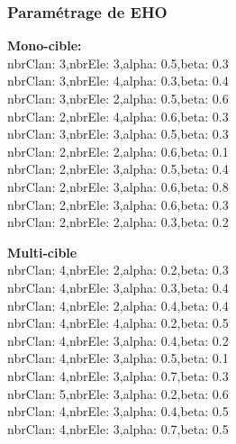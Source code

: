 \subsubsection{Paramétrage de EHO}
\noindent
\begin{minipage}[t]{0.55\textwidth}
	\textbf{Mono-cible:} \\
nbrClan: 3,nbrEle: 3,alpha: 0.5,beta: 0.3\\
nbrClan: 3,nbrEle: 4,alpha: 0.3,beta: 0.4\\
nbrClan: 3,nbrEle: 2,alpha: 0.5,beta: 0.6\\
nbrClan: 2,nbrEle: 4,alpha: 0.6,beta: 0.3\\
nbrClan: 3,nbrEle: 3,alpha: 0.5,beta: 0.3\\
nbrClan: 2,nbrEle: 2,alpha: 0.6,beta: 0.1\\
nbrClan: 2,nbrEle: 3,alpha: 0.5,beta: 0.4\\
nbrClan: 2,nbrEle: 3,alpha: 0.6,beta: 0.8\\
nbrClan: 2,nbrEle: 3,alpha: 0.6,beta: 0.3\\
nbrClan: 2,nbrEle: 2,alpha: 0.3,beta: 0.2
	
\end{minipage}\hfill
\hspace{0.2cm}
\begin{minipage}[t]{0.55\textwidth}
	\textbf{Multi-cible}\\
nbrClan: 4,nbrEle: 2,alpha: 0.2,beta: 0.3\\
nbrClan: 4,nbrEle: 3,alpha: 0.3,beta: 0.4\\
nbrClan: 4,nbrEle: 2,alpha: 0.4,beta: 0.4\\
nbrClan: 4,nbrEle: 4,alpha: 0.2,beta: 0.5\\
nbrClan: 4,nbrEle: 3,alpha: 0.4,beta: 0.2\\
nbrClan: 4,nbrEle: 3,alpha: 0.5,beta: 0.1\\
nbrClan: 4,nbrEle: 3,alpha: 0.7,beta: 0.3\\
nbrClan: 5,nbrEle: 3,alpha: 0.2,beta: 0.6\\
nbrClan: 4,nbrEle: 3,alpha: 0.4,beta: 0.5\\
nbrClan: 4,nbrEle: 3,alpha: 0.7,beta: 0.5

\end{minipage}\hfill


